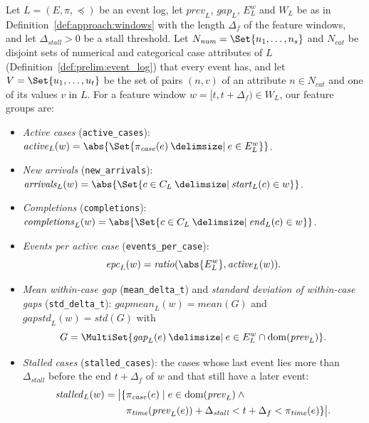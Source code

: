 \begin{definition}
	\label{def:approach:inter}
	Let $L = (E, \pi, \preceq)$ be an event log, let $\mathit{prev}_L$, $\mathit{gap}_L$, $E^w_L$ and $W_L$ be as in Definition~\ref{def:approach:windows} with the length $\Delta_f$ of the feature windows, and let $\Delta_{\mathit{stall}} > 0$ be a stall threshold. Let $N_{\mathit{num}} = \Set{n_1, \dots, n_s}$ and $N_{\mathit{cat}}$ be disjoint sets of numerical and categorical case attributes of $L$ (Definition~\ref{def:prelim:event_log}) that every event has, and let $V = \Set{u_1, \dots, u_t}$ be the set of pairs $(n, v)$ of an attribute $n \in N_{\mathit{cat}}$ and one of its values $v$ in $L$. For a feature window $w = [t, t + \Delta_f) \in W_L$, our feature groups are:
	\begin{itemize}
		\item \emph{Active cases} (\texttt{active\_cases}): $\mathit{active}_L(w) = \abs{\Set{\pi_{\mathit{case}}(e) \given e \in E^w_L}}$.
		\item \emph{New arrivals} (\texttt{new\_arrivals}): $\mathit{arrivals}_L(w) = \abs{\Set{c \in C_L \given \mathit{start}_L(c) \in w}}$.
		\item \emph{Completions} (\texttt{completions}): $\mathit{completions}_L(w) = \abs{\Set{c \in C_L \given \mathit{end}_L(c) \in w}}$.
		\item \emph{Events per active case} (\texttt{events\_per\_case}):
		      \[
			      \mathit{epc}_L(w) = \mathit{ratio}(\abs{E^w_L}, \mathit{active}_L(w)).
		      \]
		\item \emph{Mean within-case gap} (\texttt{mean\_delta\_t}) and \emph{standard deviation of within-case gaps} (\texttt{std\_delta\_t}): $\mathit{gapmean}_L(w) = \mathit{mean}(G)$ and $\mathit{gapstd}_L(w) = \mathit{std}(G)$ with
		      \[
			      G = \MultiSet{\mathit{gap}_L(e) \given e \in E^w_L \cap \dom(\mathit{prev}_L)}.
		      \]
		\item \emph{Stalled cases} (\texttt{stalled\_cases}): the cases whose last event lies more than $\Delta_{\mathit{stall}}$ before the end $t + \Delta_f$ of $w$ and that still have a later event:
		      \[
			      \begin{aligned}
				      \mathit{stalled}_L(w) = \bigl\lvert\{ & \pi_{\mathit{case}}(e) \mid e \in \dom(\mathit{prev}_L) \land {} \\
				                                          & \pi_{\mathit{time}}(\mathit{prev}_L(e)) + \Delta_{\mathit{stall}} < t + \Delta_f < \pi_{\mathit{time}}(e)\}\bigr\rvert.

\end{aligned}\]
\end{itemize}
\end{definition}
